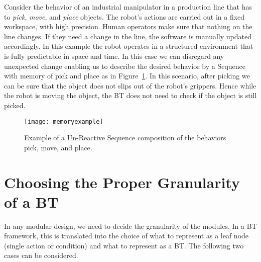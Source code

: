 Consider the behavior of an industrial manipulator in a production line that has to \emph{pick}, \emph{move}, and \emph{place} objects. The robot's actions are carried out in a fixed workspace, with high precision. Human operators
make sure that nothing on the line changes. If they need a change in the line,
the software is manually updated accordingly. In this example the robot operates in a structured environment that is fully predictable in space and time. In this case we can disregard any unexpected change enabling us to describe the desired behavior
by a Sequence with memory of pick and place as in Figure~\ref{design:fig:mem}. In this scenario, after picking we can be sure that the object does not slips out of the robot's grippers. Hence while the robot is moving the object, the BT does not need to check if the object is still picked.  
\label{design:ex:mem}
\begin{figure}[h]
\centering
  \texttt{[image: memoryexample]}
\caption{Example of a Un-Reactive Sequence composition of the behaviors pick, move, and place.}
\label{design:fig:mem}
\end{figure}



\section{Choosing the Proper Granularity of a BT}
\label{design:sec:granularity}

In any modular design, 
 we need to decide the granularity of the modules. In a BT framework, this is translated into the choice of what to represent as a leaf node (single action or condition) and what to represent as a BT. 
The following two cases can be considered.


